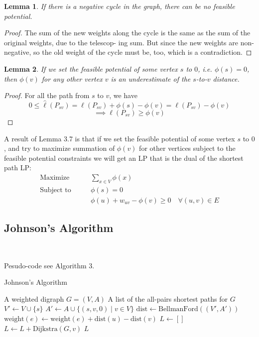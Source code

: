 \documentclass[11pt]{article}
\theoremstyle{plain}
\newtheorem{lemma}{Lemma}[section]
\begin{document}
  \begin{lemma}
    If there is a negative cycle in the graph, there can be no feasible potential.
  \end{lemma}
  \begin{proof}
    The sum of the new weights along the cycle is
    the same as the sum of the original weights, due to the telescop-
    ing sum. But since the new weights are non-negative, so the old
    weight of the cycle must be, too, which is a contradiction.
  \end{proof}

  \begin{lemma}
    If we set the feasible potential of some vertex $s$ to $0$, i.e. $\phi(s) = 0$, then 
    $\phi(v)$ for any other vertex $v$ is an underestimate of the $s$-to-$v$ distance.
  \end{lemma}
  \begin{proof}
  For all the path from $s$ to $v$, we have
  \[
    0 \leq \hat \ell(P_{sv}) = \ell(P_{sv}) + \phi(s) - \phi(v) = \ell(P_{sv}) - \phi(v)
  \]
  \[
    \implies \ell(P_{sv}) \geq \phi(v)
  \]
  \end{proof}

  A result of Lemma 3.7 is that if we set the feasible potential of some vertex $s$ to $0$, 
  and try to maximize summation of $\phi(v)$ for other vertices subject to the feasible 
  potential constraints we will get an LP that is the dual of the shortest path LP:\@
  \begin{align*}
    \text{Maximize}\qquad &\sum_{x\in V} \phi(x) \\
    \text{Subject to}\qquad &\phi(s) = 0 \\
    &\phi(u) + w_{uv} - \phi(v) \geq 0 \quad \forall (u, v) \in E
  \end{align*}

\subsection{Johnson's Algorithm}\

Pesudo-code see Algorithm 3.

\begin{algorithm}
  \caption{Johnson's Algorithm}
  \begin{algorithmic}[1]
  \REQUIRE A weighted digraph $G = (V, A)$
  \ENSURE A list of the all-pairs shortest paths for $G$
  \STATE $V' \leftarrow V \cup \{s\}$ 
  \STATE $A' \leftarrow A \cup \{(s, v, 0) \mid v \in V\}$
  \STATE $\text{dist} \leftarrow \text{BellmanFord}((V', A'))$ 
      \STATE $\text{weight}(e) \leftarrow \text{weight}(e) + \text{dist}(u) - \text{dist}(v)$
  \ENDFOR
  \STATE $L \leftarrow []$ 
      \STATE $L \leftarrow L + \text{Dijkstra}(G, v)$
  \ENDFOR
  \RETURN $L$
  \end{algorithmic}
\end{algorithm}
\end{document}
